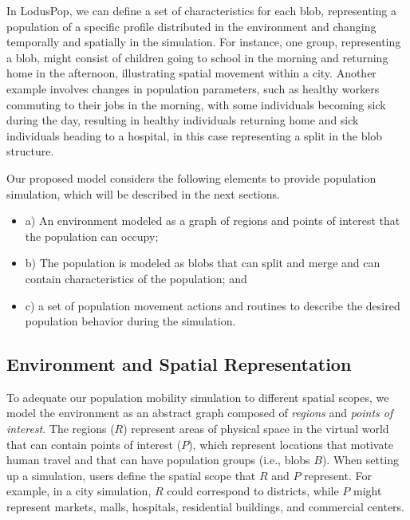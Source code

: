 \documentclass[pdflatex,sn-mathphys-num]{sn-jnl}%
\theoremstyle{thmstyleone}%
\theoremstyle{thmstyletwo}%
\theoremstyle{thmstylethree}%
\begin{document}
In LodusPop, we can define a set of characteristics for each blob, representing a population of a specific profile distributed in the environment and changing temporally and spatially in the simulation. For instance, one group, representing a blob, might consist of children going to school in the morning and returning home in the afternoon, illustrating spatial movement within a city. Another example involves changes in population parameters, such as healthy workers commuting to their jobs in the morning, with some individuals becoming sick during the day, resulting in healthy individuals returning home and sick individuals heading to a hospital, in this case representing a split in the blob structure.

Our proposed model considers the following elements to provide population simulation, which will be described in the next sections. 
\begin{itemize}
    \item a) An environment modeled as a graph of regions and points of interest that the population can occupy;
    \item b) The population is modeled as blobs that can split and merge and can contain characteristics of the population; and
    \item c) a set of population movement actions and routines to describe the desired population behavior during the simulation.
\end{itemize} 



\subsection{Environment and Spatial Representation}
\label{sec:environment}

To adequate our population mobility simulation to different spatial scopes, we model the environment as an abstract graph composed of \textit{regions} and \textit{points of interest}. The regions ($R$) represent areas of physical space in the virtual world that can contain points of interest ($P$), which represent locations that motivate human travel and that can have population groups (i.e., blobs $B$). 
When setting up a simulation, users define the spatial scope that $R$ and $P$ represent. For example, in a city simulation, $R$ could correspond to districts, while $P$ might represent markets, malls, hospitals, residential buildings, and commercial centers. 
\end{document}
